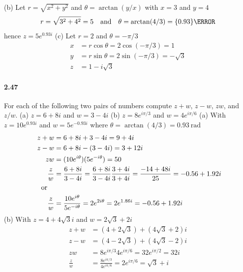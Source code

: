 \documentclass[../problems.tex]{subfiles}
\begin{document}
(b) Let $r = \sqrt{x^2 + y^2}$ and $\theta = \arctan(y/x)$ with $x=3$ and $y=4$
\begin{equation*}
        r = \sqrt{3^2 + 4^2} = 5 \qand \theta = \arctan(4/3) = \qty{0.93}{\radian}
\end{equation*}
hence $z = 5 e^{0.93i}$
(c) Let $r = 2$ and $\theta = -\pi/3$
\begin{align*}
    x &= r\cos\theta = 2\cos(-\pi/3) = 1 \\
    y &= r\sin\theta = 2\sin(-\pi/3) = -\sqrt{3} \\
    z &= 1 - i\sqrt{3}
\end{align*}

\paragraph{2.47} For each of the following two pairs of numbers compute $z+w$, $z-w$, $zw$, and 
$z/w$. (a) $z=6+8i$ and $w=3-4i$ (b) $z=8e^{i\pi/3}$ and $w=4e^{i\pi/6}$
\barh 
(a) With $z=10e^{0.93i}$ and $w=5e^{-0.93i}$ where $\theta = \arctan(4/3) = \qty{0.93}{\radian}$
\begin{align*}
    z+w &= 6+8i + 3-4i = 9+4i \\
    z-w &= 6+8i - (3-4i) = 3+12i \\
    zw &= (10e^{i\theta})(5e^{-i\theta}) = 50 \\ 
    \frac{z}{w} &= \frac{6+8i}{3-4i} = \frac{6+8i}{3-4i} \frac{3+4i}{3+4i} = \frac{-14+48i}{25} 
        = -0.56 + 1.92i \\
    \qor \\
    \frac{z}{w} &= \frac{10e^{i\theta}}{5e^{-i\theta}} = 2e^{2i\theta} = 2e^{1.86i} = -0.56 + 1.92i
\end{align*}
(b) With $z=4 + 4\sqrt{3}i$ and $w=2\sqrt{3} + 2i$
\begin{align*}
    z+w &= (4+2\sqrt{3}) + (4\sqrt{3} + 2)i \\
    z-w &= (4-2\sqrt{3}) + (4\sqrt{3} - 2)i \\
    zw &= 8e^{i\pi/3}4e^{i\pi/6} = 32e^{i\pi/2} = 32i \\
    \frac{z}{w} &= \frac{8e^{i\pi/3}}{4e^{i\pi/6}} = 2e^{i\pi/6} = \sqrt{3} + i
\end{align*}
\end{document}
